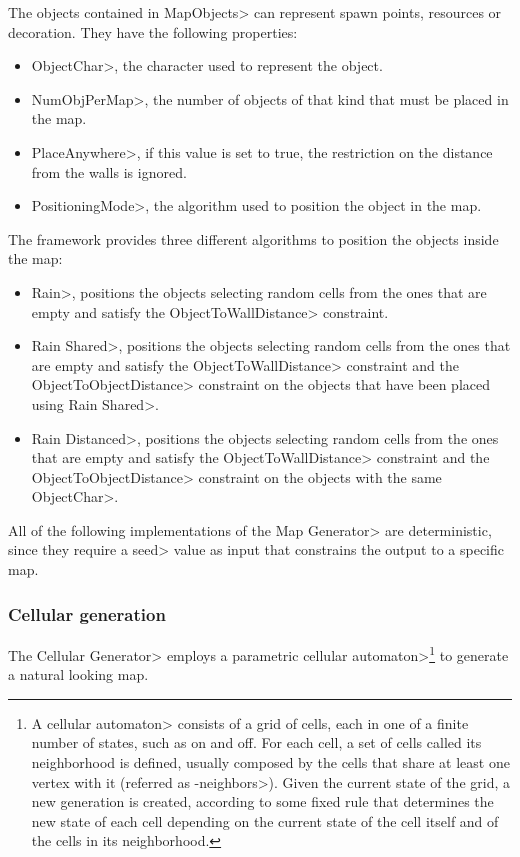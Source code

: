 The objects contained in \<MapObjects> can represent spawn points, resources or decoration. They have the following properties:

\begin{itemize}
\item \<ObjectChar>, the character used to represent the object.
\item \<NumObjPerMap>,  the number of objects of that kind that must be placed in the map.
\item \<PlaceAnywhere>, if this value is set to true, the restriction on the distance from the walls is ignored.
\item \<PositioningMode>, the algorithm used to position the object in the map.
\end{itemize}

The framework provides three different algorithms to position the objects inside the map:

\begin{itemize}
\item \<Rain>, positions the objects selecting random cells from the ones that are empty and satisfy the  \<ObjectToWallDistance> constraint.
\item \<Rain Shared>, positions the objects selecting random cells from the ones that are empty and satisfy the  \<ObjectToWallDistance> constraint and the \<ObjectToObjectDistance> constraint on the objects that have been placed using \<Rain Shared>.
\item \<Rain Distanced>, positions the objects selecting random cells from the ones that are empty and satisfy the  \<ObjectToWallDistance> constraint and the \<ObjectToObjectDistance> constraint on the objects with the same \<ObjectChar>.
\end{itemize}

All of the following implementations of the \<Map Generator> are deterministic, since they require a \<seed> value as input that constrains the output to a specific map.

\subsubsection{Cellular generation}

The \<Cellular Generator> employs a parametric \<cellular automaton>\footnote{A \<cellular automaton> consists of a grid of cells, each in one of a finite number of states, such as on and off. For each cell, a set of cells called its neighborhood is defined, usually composed by the cells that share at least one vertex with it (referred as -neighbors>). Given the current state of the grid, a new generation is created, according to some fixed rule that determines the new state of each cell depending on the current state of the cell itself and of the cells in its neighborhood.} to generate a natural looking map. 

